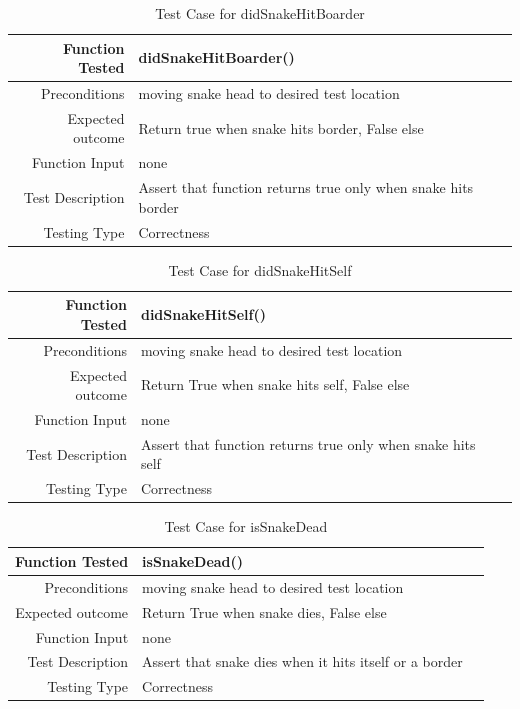 \documentclass[12pt]{article}
\begin{document}
\begin{center}
	\begin{longtable}{ | r | p{4cm} | p{4cm} }
	\caption{Test Case for didSnakeHitBoarder} \\ \hline \label{TblInputVar} 
	Function Tested & didSnakeHitBoarder()\\ \hline
	Preconditions & moving snake head to desired test location \\ \hline
	Expected outcome & Return true when snake hits border, False else  \\ \hline
	Function Input & none \\ \hline
	Test Description & Assert that function returns true only when snake hits border \\ \hline
	Testing Type & Correctness\\ \hline
	
	\end{longtable}
\end{center}

\begin{center}
	\begin{longtable}{ | r | p{4cm} | p{4cm} }
	\caption{Test Case for didSnakeHitSelf} \\ \hline \label{TblInputVar} 
	Function Tested & didSnakeHitSelf()\\ \hline
	Preconditions & moving snake head to desired test location \\ \hline
	Expected outcome & Return True when snake hits self, False else \\ \hline
	Function Input & none \\ \hline
	Test Description & Assert that function returns true only when snake hits self \\ \hline
	Testing Type & Correctness\\ \hline
	
	\end{longtable}
\end{center}
	
\begin{center}
	\begin{longtable}{ | r | p{4cm} | p{4cm} }
	\caption{Test Case for isSnakeDead} \\ \hline \label{TblInputVar} 
	Function Tested & isSnakeDead()\\ \hline
	Preconditions & moving snake head to desired test location \\ \hline
	Expected outcome & Return True when snake dies, False else \\ \hline
	Function Input & none \\ \hline
	Test Description & Assert that snake dies when it hits itself or a border\\ \hline
	Testing Type & Correctness\\ \hline
	
	\end{longtable}
\end{center}
\end{document}
